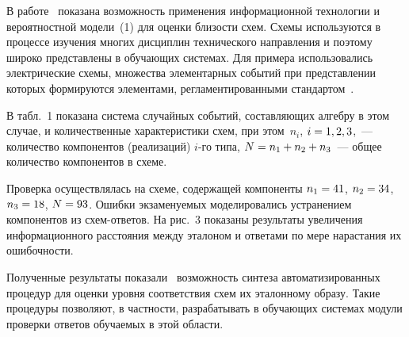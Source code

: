 \begin{multicols}{2}
  В работе~\cite{4-kuz} показана возможность применения информационной
технологии и вероятностной модели~(1) для оценки близости схем. Схемы
используются в процессе изучения многих дисциплин технического
направления и поэтому широко представлены в обучающих системах. Для
примера использовались электрические схемы, множества элементарных
событий при представлении которых формируются элементами,
регламентированными стандартом~\cite{7-kuz}.

  В табл.~1 показана система случайных событий, составляющих алгебру в
этом случае, и количественные характеристики схем, при этом~$n_i$, $i\hm= 1,
2, 3$,~--- количество компонентов (реализаций) $i$-го типа, $N\hm=n_1 \hm+
n_2\hm + n_3$~--- общее количество компонентов в схеме.



  Проверка осуществлялась на схеме, содержащей компоненты $n_1\hm=41$,
$n_2\hm=34$, $n_3\hm=18$, $N\hm=93$. Ошибки экзаменуемых моделировались
устранением компонентов из схем-от\-ве\-тов. На рис.~3 показаны результаты
увеличения информационного расстояния между эталоном и ответами по мере
нарастания их ошибочности.



  Полученные результаты показали~\cite{4-kuz} возможность синтеза
автоматизированных процедур для оценки уровня соответствия схем их
эталонному образу. Такие процедуры позволяют, в частности, разрабатывать в
обучающих системах модули проверки ответов обучаемых в этой области.

  \begin{table*}[b]\small %
  \begin{center}
  \vspace*{2ex}


\end{center}
\end{table*}
\end{multicols}

